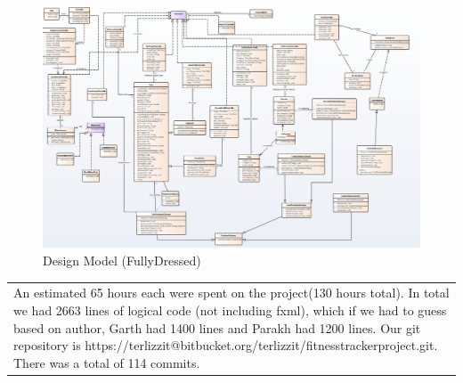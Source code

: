 \documentclass[10pt]{article}
\renewenvironment{quote}
  {\begin{tabular}{|p{13cm}}}
  {\end{tabular}}
\begin{document}
\begin{figure}[h!]
	\begin{center}
		\includegraphics[width=\columnwidth]{DesignFull.png}
		\caption{{Design Model (FullyDressed)
				{\label{div-291050}}%
		}}
	\end{center}
\end{figure}

\begin{quote}
	An estimated 65 hours each were spent on the project(130 hours total). In total we had 2663 lines of logical code (not including fxml), which if we had to guess based on author, Garth had 1400 lines and Parakh had 1200 lines. Our git repository is  https://terlizzit@bitbucket.org/terlizzit/fitnesstrackerproject.git. There was a total of 114 commits.
\end{quote}
\clearpage
\end{document}
